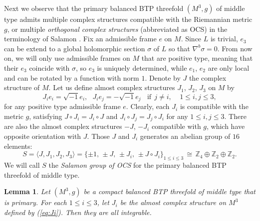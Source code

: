 \documentclass{amsart}
\numberwithin{equation}{section}
\newtheorem{lemma}  [theorem]     {Lemma}
\theoremstyle{definition}
\renewcommand{\1}{\mathds{1}}
\renewcommand{\>}{\rightarrow}
\begin{document}
\vspace{0.2cm}

Next we observe that the primary balanced BTP threefold $(M^3,g)$ of middle type admits multiple complex structures compatible with the Riemannian metric $g$, or multiple {\em orthogonal complex structures} (abbreviated as OCS) in the terminology of Salamon \cite{Salamon2}. Fix an admissible frame $e$ on $M$. Since $L$ is trivial,  $e_3$ can be extend  to a global holomorphic section $\sigma$ of $L$ so that $\nabla^b \sigma =0$. From now on, we will only use admissible frames on $M$ that are positive type, meaning that their $e_3$ coincide with $\sigma$, so $e_3$ is uniquely determined, while $e_1$, $e_2$ are only local and can be rotated by a function with norm $1$.  Denote by $J$ the complex structure of $M$. Let us define almost complex structures $J_1$, $J_2$, $J_3$ on $M$ by
\begin{equation} \label{eq:Ji}
J_ie_i=\sqrt{-1}e_i, \ \ \ J_ie_j=-\sqrt{-1}e_j \ \ \ \ \mbox{if} \ \ j\neq i, \ \ \ \ \ 1\leq i,j\leq 3,
\end{equation}
for any positive type admissible frame $e$. Clearly, each $J_i$ is compatible with the metric $g$, satisfying $J\circ J_i=J_i \circ J$ and  $J_i \circ J_j = J_j\circ J_i$ for any $1\leq i,j \leq 3$. There are also the almost complex structures $-J$, $-J_i$ compatible with $g$, which have opposite orientation with $J$. Those $J$ and  $J_i$ generates an abelian group of $16$ elements:
$$ S=\langle J, J_1, J_2, J_3\rangle  =  \{ \pm 1, \,\pm J, \,\pm J_i, \,\pm J\circ J_i \}_{1\leq i\leq 3} \,\cong \,{\mathbb Z}_4  \oplus {\mathbb Z}_2 \oplus {\mathbb Z}_2. $$
We will call $S$ the {\em Salamon group of OCS} for the primary balanced BTP threefold of middle type.

\begin{lemma} \label{claim:int}
Let $(M^3,g)$ be a compact balanced BTP threefold of middle type that is primary. For each $1\leq i\leq 3$, let $J_i$ be the almost complex structure on $M^3$ defined by (\ref{eq:Ji}). Then they are all integrable.
\end{lemma}
\end{document}
